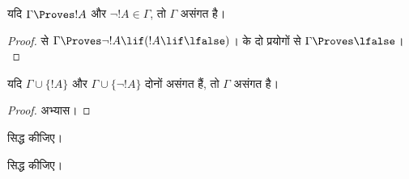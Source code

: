 \documentclass[../../../include/open-logic-section]{subfiles}
\begin{document}
\begin{prop}
  यदि $\Gamma \Proves !A$ और $\lnot !A \in \Gamma$, तो $\Gamma$ असंगत है।
\end{prop}

\begin{proof}
   से
  $\Gamma \Proves \lnot !A \lif (!A \lif \lfalse)$।
   के दो प्रयोगों से $\Gamma \Proves \lfalse$।
\end{proof}


\begin{prop}
  यदि $\Gamma \cup \{!A\}$ और $\Gamma \cup \{\lnot !A\}$ दोनों असंगत
  हैं, तो $\Gamma$ असंगत है।
\end{prop}

\begin{proof}
अभ्यास।
\end{proof}

\begin{prob}
   सिद्ध कीजिए।
\end{prob}
\tagendprob

\begin{prob}
   सिद्ध कीजिए।
\end{prob}
\tagendprob
\end{document}
